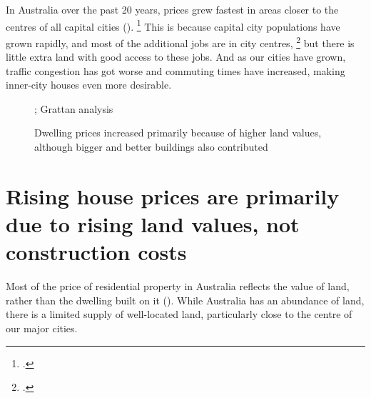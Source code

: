 




In Australia over the past 20 years, prices grew fastest in areas closer to the centres of all capital cities ().%
	\footcite{Ellis2015propmarkets}
This is because capital city populations have grown rapidly, and most of the additional jobs are in city centres,%
	\footcites{KellyDonegan2015-City-limits}{Daley-productivity-geography}
but there is little extra land with good access to these jobs.
And as our cities have grown, traffic congestion has got worse and commuting times have increased, making inner-city houses even more desirable.

\begin{figure}
\caption{Dwelling prices increased primarily because of higher land values, although bigger and better buildings also contributed}\label{fig:aus-property-value}
%
{\textcites{ABS-aus-system-of-nat-accounts2016-17}{ABS-2017-CPI-Sep}; Grattan analysis}
\end{figure}

\section{Rising house prices are primarily due to rising land values, not construction costs }\label{sec:rising-house-prices-are-primarily-due-to-rising-land-values-not-construction-costs}

Most of the price of residential property in Australia reflects the value of land, rather than the dwelling built on it ().
While Australia has an abundance of land, there is a limited supply of well-located land, particularly close to the centre of our major cities.


